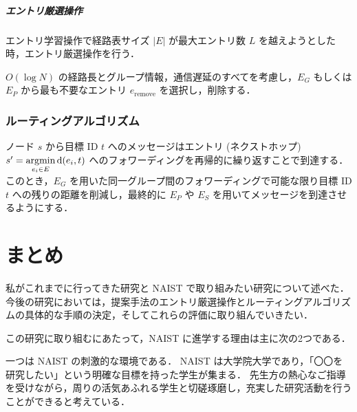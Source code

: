 \documentclass[10pt, a4paper, twocolumn]{jsarticle}
\newcommand{\argmin}{\mathop{\rm argmin}\limits}
\begin{document}
\subparagraph{エントリ厳選操作}
エントリ学習操作で経路表サイズ $|E|$ が最大エントリ数 $L$ を越えようとした時，エントリ厳選操作を行う．

$O(\log N)$ の経路長とグループ情報，通信遅延のすべてを考慮し，$E_G$ もしくは $E_P$ から最も不要なエントリ $e_\mathrm{remove}$ を選択し，削除する．

%
%
%



\subsubsection{ルーティングアルゴリズム}
ノード $s$ から目標 ID $t$ へのメッセージはエントリ (ネクストホップ) $s' = \argmin_{e_i \in E} \mathrm{d}(e_i, t)$ へのフォワーディングを再帰的に繰り返すことで到達する．
このとき，$E_G$ を用いた同一グループ間のフォワーディングで可能な限り目標 ID $t$ への残りの距離を削減し，最終的に $E_P$ や $E_S$ を用いてメッセージを到達させるようにする．

\section{まとめ}
私がこれまでに行ってきた研究と NAIST で取り組みたい研究について述べた．
今後の研究においては，提案手法のエントリ厳選操作とルーティングアルゴリズムの具体的な手順の決定，そしてこれらの評価に取り組んでいきたい．

この研究に取り組むにあたって，NAIST に進学する理由は主に次の2つである．

一つは NAIST の刺激的な環境である．
NAIST は大学院大学であり，「〇〇を研究したい」という明確な目標を持った学生が集まる．
先生方の熱心なご指導を受けながら，周りの活気あふれる学生と切磋琢磨し，充実した研究活動を行うことができると考えている．
\end{document}
